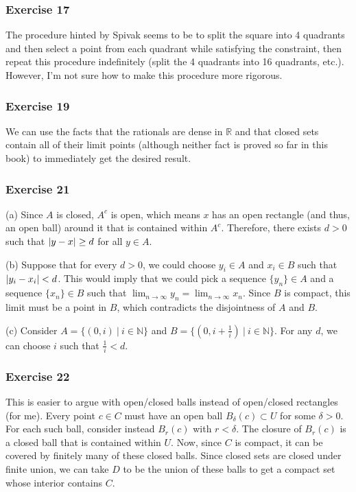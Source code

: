 \subsubsection{Exercise 17}
The procedure hinted by Spivak seems to be to split the square into 4 quadrants and then select a point from
each quadrant while satisfying the constraint, then repeat this procedure indefinitely (split the 4 quadrants
into 16 quadrants, etc.). However, I'm not sure how to make this procedure more rigorous.

\subsubsection{Exercise 19}
We can use the facts that the rationals are dense in $\mathbb{R}$ and that closed sets contain all of their
limit points (although neither fact is proved so far in this book) to immediately get the desired result.

\subsubsection{Exercise 21}
(a) Since $A$ is closed, $A^c$ is open, which means $x$ has an open rectangle (and thus, an open ball) around
it that is contained within $A^c$. Therefore, there exists $d > 0$ such that $\abs{y - x} \geq d$ for all
$y \in A$.

(b) Suppose that for every $d > 0$, we could choose $y_i \in A$ and $x_i \in B$ such that $\abs{y_i - x_i} < d$.
This would imply that we could pick a sequence $\{y_n\} \in A$ and a sequence $\{x_n\} \in B$ such that
 $\lim_{n \to \infty} y_n = \lim_{n \to \infty} x_n$. Since $B$ is compact, this limit must be a point in
  $B$, which contradicts the disjointness of  $A$ and  $B$.

(c) Consider $A = \{(0, i) \: | \: i \in \mathbb{N}\}$ and $B = \{(0, i + \frac{1}{i}) \: | \: i \in \mathbb{N}\}$.
For any $d$, we can choose $i$  such that $\frac{1}{i} < d$.

\subsubsection{Exercise 22}
This is easier to argue with open/closed balls instead of open/closed rectangles (for me). Every point
$c \in C$ must have an open ball $B_{\delta} (c) \subset U$ for some $\delta > 0$. For each such ball,
consider instead $B_{r} (c)$ with $r < \delta$. The closure of $B_r(c)$ is a closed ball that is contained
within $U$. Now, since $C$ is compact, it can be covered by finitely many of these closed balls. Since
closed sets are closed under finite union, we can take $D$ to be the union of these balls to get a compact
set whose interior contains $C$.

